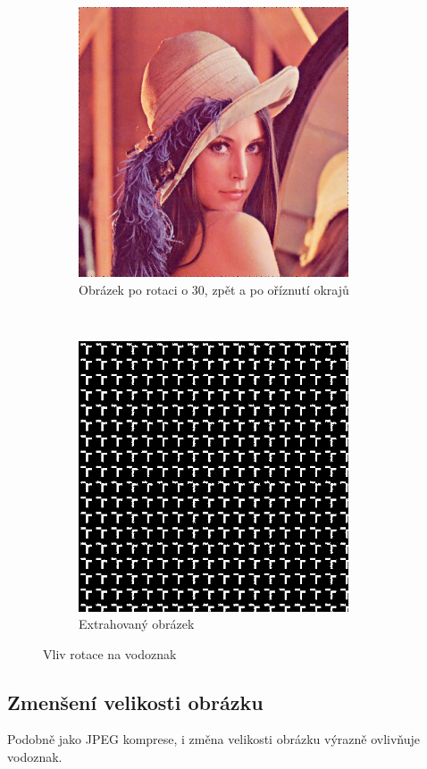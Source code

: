 \begin{figure}[h!]
    \begin{center}
        \begin{subfigure}[t]{0.5\textwidth}
            \centering
            \includegraphics[height=8cm]{images/rotation_30deg_fin.jpg}
            \caption{Obrázek po rotaci o 30\textdegree{}, zpět a po oříznutí okrajů}
        \end{subfigure}%
        ~
        \begin{subfigure}[t]{0.5\textwidth}
            \centering
            \includegraphics[height=8cm]{images/rotation_30deg_extracted.jpg}
            \caption{Extrahovaný obrázek}
        \end{subfigure}
        \caption{Vliv rotace na vodoznak}
    \end{center}
\end{figure}

\clearpage
\subsection[zmenseni]{Zmenšení velikosti obrázku}
Podobně jako JPEG komprese, i změna velikosti obrázku výrazně ovlivňuje vodoznak.

